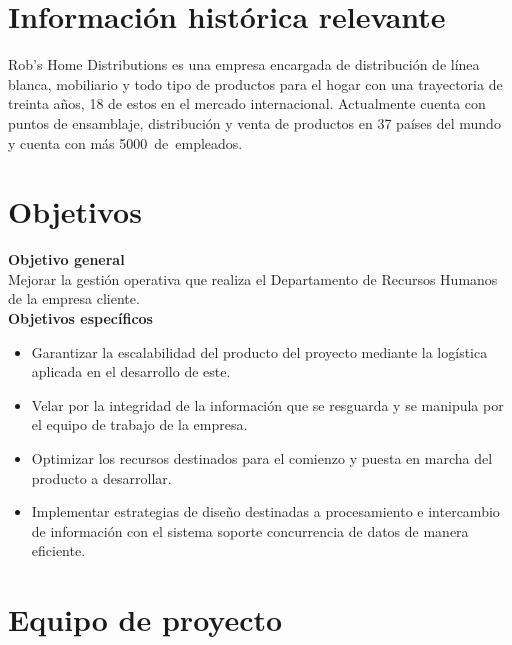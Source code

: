   \section{Información histórica relevante}
  Rob's Home Distributions es una empresa encargada de distribución de línea blanca, mobiliario y todo tipo de productos para el hogar con una trayectoria de treinta años, 18 de estos en el mercado internacional. Actualmente cuenta con puntos de ensamblaje, distribución y venta de productos en 37 países del mundo y cuenta con más 5000 de empleados.

  \section{Objetivos}
  \noindent
  \textbf{Objetivo general}
  \\ \newline
  Mejorar la gestión operativa que realiza el Departamento de Recursos Humanos de la empresa cliente.
  \\ \newline
  \textbf{Objetivos específicos}
  \noindent
  \begin{itemize}
    \item Garantizar la escalabilidad del producto del proyecto mediante la logística aplicada en el desarrollo de este.
    \item Velar por la integridad de la información que se resguarda y se manipula por el equipo de trabajo de la empresa.
    \item Optimizar los recursos destinados para el comienzo y puesta en marcha del producto a desarrollar.
    \item Implementar estrategias de diseño destinadas a procesamiento e intercambio de información con el sistema soporte concurrencia de datos de manera eficiente.
  \end{itemize}

  \section{Equipo de proyecto}

